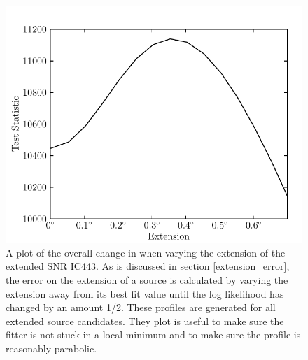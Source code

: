 \documentclass[12pt,preprint]{aastex}
\newcommand{\ts}{\text{TS}\xspace}
\begin{document}
\clearpage
\begin{figure}
  \begin{center}
    \includegraphics{ic443_plots/profile_ic443.pdf}
    \caption{
    A plot of the overall change in \ts when varying the
    extension of the extended SNR IC443.  As is discussed in section
    \ref{extension_error}, the error on the extension of a source is
    calculated by varying the extension away from its best fit value until
    the log likelihood has changed by an amount 1/2.  These profiles are
    generated for all extended source candidates. They plot is useful
    to make sure the fitter is not stuck in a local minimum and to make
    sure the profile is reasonably parabolic.
    }
    \label{extension_profile}
  \end{center}
\end{figure}
\end{document}
